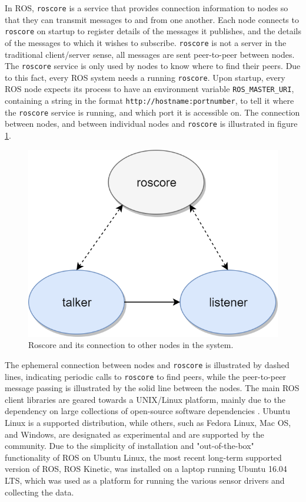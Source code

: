 In ROS, \lstinline[basicstyle=\ttfamily]{roscore} is a service that provides connection information to nodes so that they can transmit messages to and from one another. Each node connects to \lstinline[basicstyle=\ttfamily]{roscore} on startup to register details of the messages it publishes, and the details of the messages to which it wishes to subscribe. \lstinline[basicstyle=\ttfamily]{roscore} is not a server in the traditional client/server sense, all messages are sent peer-to-peer between nodes. The \lstinline[basicstyle=\ttfamily]{roscore} service is only used by nodes to know where to find their peers. Due to this fact, every ROS system needs a running \lstinline[basicstyle=\ttfamily]{roscore}. Upon startup, every ROS node expects its process to have an environment variable \lstinline[basicstyle=\ttfamily]{ROS_MASTER_URI}, containing a string in the format \lstinline[basicstyle=\ttfamily]{http://hostname:portnumber}, to tell it where the \lstinline[basicstyle=\ttfamily]{roscore} service is running, and which port it is accessible on. The connection between nodes, and between individual nodes and \lstinline[basicstyle=\ttfamily]{roscore} is illustrated in figure \ref{fig:roscore}.
\begin{figure}[H]
    \centering
    \includegraphics[width=.4\linewidth]{fig/roscore.png}
    \caption{Roscore and its connection to other nodes in the system.}
    \label{fig:roscore}
\end{figure}
The ephemeral connection between nodes and \lstinline[basicstyle=\ttfamily]{roscore} is illustrated by dashed lines, indicating periodic calls to \lstinline[basicstyle=\ttfamily]{roscore} to find peers, while the peer-to-peer message passing is illustrated by the solid line between the nodes.
The main ROS client libraries are geared towards a UNIX/Linux platform, mainly due to the dependency on large collections of open-source software dependencies . Ubuntu Linux is a supported distribution, while others, such as Fedora Linux, Mac OS, and Windows, are designated as experimental and are supported by the community. Due to the simplicity of installation and "out-of-the-box" functionality of ROS on Ubuntu Linux, the most recent long-term supported version of ROS, ROS Kinetic, was installed on a laptop running Ubuntu 16.04 LTS, which was used as a platform for running the various sensor drivers and collecting the data.
